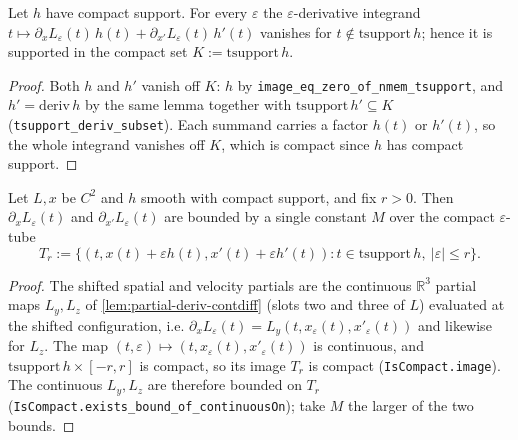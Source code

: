 \begin{lemma}
    \label{lem:deriv-integrand-support}
    \leanok
    Let $h$ have compact support. For every $\varepsilon$ the
    $\varepsilon$-derivative integrand
    $t \mapsto \partial_x L_\varepsilon(t)\,h(t) + \partial_{x'} L_\varepsilon(t)\,
    h'(t)$ vanishes for $t \notin \mathrm{tsupport}\,h$; hence it is supported in
    the compact set $K := \mathrm{tsupport}\,h$.
\end{lemma}
\begin{proof}
    Both $h$ and $h'$ vanish off $K$: $h$ by
    \texttt{image\_eq\_zero\_of\_nmem\_tsupport}, and $h' = \mathrm{deriv}\,h$ by
    the same lemma together with $\mathrm{tsupport}\,h' \subseteq K$
    (\texttt{tsupport\_deriv\_subset}). Each summand carries a factor $h(t)$ or
    $h'(t)$, so the whole integrand vanishes off $K$, which is compact since $h$
    has compact support.
\end{proof}

\begin{lemma}
    \label{lem:tube-bound}
    \leanok
    Let $L, x$ be $C^2$ and $h$ smooth with compact support, and fix $r > 0$.
    Then $\partial_x L_\varepsilon(t)$ and $\partial_{x'} L_\varepsilon(t)$ are
    bounded by a single constant $M$ over the compact $\varepsilon$-tube
    \[
      T_r := \bigl\{ (t, x(t)+\varepsilon h(t), x'(t)+\varepsilon h'(t)) :
        t \in \mathrm{tsupport}\,h,\ |\varepsilon| \le r \bigr\}.
    \]
\end{lemma}
\begin{proof}
    The shifted spatial and velocity partials are the continuous $\mathbb{R}^3$
    partial maps $L_y, L_z$ of \cref{lem:partial-deriv-contdiff} (slots two and
    three of $L$) evaluated at the shifted configuration, i.e.
    $\partial_x L_\varepsilon(t) = L_y(t, x_\varepsilon(t), x'_\varepsilon(t))$
    and likewise for $L_z$. The map
    $(t,\varepsilon) \mapsto (t, x_\varepsilon(t), x'_\varepsilon(t))$ is
    continuous, and $\mathrm{tsupport}\,h \times [-r,r]$ is compact, so its image
    $T_r$ is compact (\texttt{IsCompact.image}). The continuous $L_y, L_z$ are
    therefore bounded on $T_r$ (\texttt{IsCompact.exists\_bound\_of\_continuousOn});
    take $M$ the larger of the two bounds.
\end{proof}

